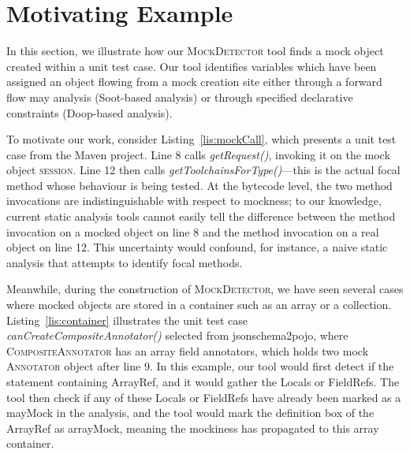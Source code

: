 \section{Motivating Example}
\label{sec:motivating-example}

In this section, we illustrate how our \textsc{MockDetector} tool finds a mock object created within a unit test case. Our tool identifies variables which have been assigned an object flowing from a mock creation site either through a forward flow may analysis (Soot-based analysis) or through specified declarative constraints (Doop-based analysis).


To motivate our work, consider Listing~\ref{lis:mockCall}, which presents a unit test case from the Maven project. Line 8 calls \textit{getRequest()}, invoking it on the mock object \textsc{session}. Line 12 then calls \textit{getToolchainsForType()}---this is the actual focal method whose behaviour is being tested. At the bytecode level, the two method invocations are indistinguishable with respect to mockness; to our knowledge, current static analysis tools cannot easily tell the difference between the method invocation on a mocked object on line 8 and the method invocation on a real object on line 12. This uncertainty would confound, for instance, a naive static analysis that attempts to identify focal methods.

Meanwhile, during the construction of \textsc{MockDetector}, we have seen several cases where mocked objects are stored in a container such as an array or a collection. Listing~\ref{lis:container} illustrates the unit test case \textit{canCreateCompositeAnnotator()} selected from jsonschema2pojo, where \textsc{CompositeAnnotator} has an array field annotators, which holds two mock \textsc{Annotator} object after line 9. In this example, our tool would first detect if the statement containing ArrayRef, and it would gather the Locals or FieldRefs. The tool then check if any of these Locals or FieldRefs have already been marked as a mayMock in the analysis, and the tool would mark the definition box of the ArrayRef as arrayMock, meaning the mockiness has propagated to this array container. 

‎


